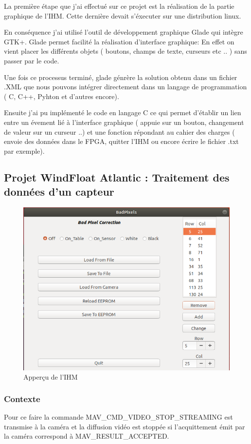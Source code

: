 
La première étape que j'ai effectué sur ce projet est la réalisation de la partie graphique de l'IHM. Cette dernière devait s'éxecuter sur une distribution linux.

En conséquence j'ai utilisé l'outil de développement graphique Glade qui intègre GTK+. Glade permet facilité la réalisation d'interface graphique: En effet on vient placer les différents objets ( boutons, champs de texte, curseurs etc .. ) sans passer par le code. 

Une fois ce processus terminé, glade génrère la solution obtenu dans un fichier .XML que nous pouvons intégrer directement dans un langage de programmation ( C, C++, Pyhton et d'autres encore). 
\newline


Ensuite j'ai pu implémenté le code en langage C ce qui permet d'établir un lien entre un évement lié à l'interface graphique ( appuie sur un bouton, changement de valeur sur un curseur ..) et une fonction répondant au cahier des charges ( envoie des données dans le FPGA, quitter l'IHM ou encore écrire le fichier .txt par exemple). 



\subsection{Projet WindFloat Atlantic : Traitement des données d'un capteur}

\begin{figure}[ht]
    \centering
    \includegraphics[scale=0.45]{img/IHM.png}
    \caption{Apperçu de l'IHM}
    \label{fig:CameraCmdsettings}
\end{figure}

\subsubsection{Contexte}




Pour ce faire la commande MAV\_CMD\_VIDEO\_STOP\_STREAMING est transmise à la caméra et la diffusion vidéo est stoppée si l'acquittement émit par la caméra correspond à MAV\_RESULT\_ACCEPTED.